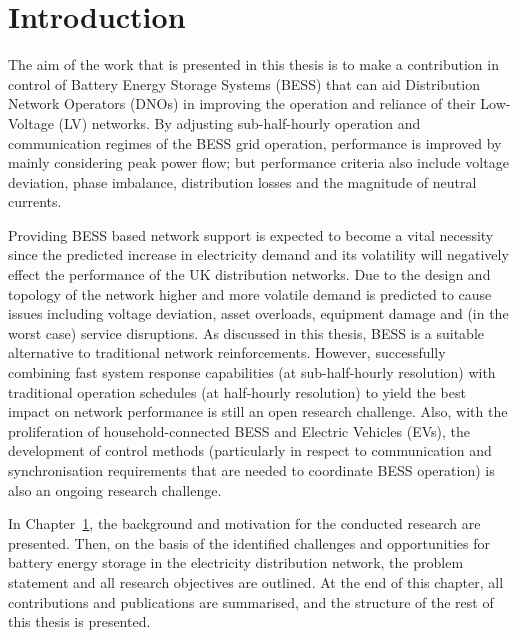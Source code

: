 \chapter{Introduction}
\label{ch-introduction}

The aim of the work that is presented in this thesis is to make a contribution in control of Battery Energy Storage Systems (BESS) that can aid Distribution Network Operators (DNOs) in improving the operation and reliance of their Low-Voltage (LV) networks.
By adjusting sub-half-hourly operation and communication regimes of the BESS grid operation, performance is improved by mainly considering peak power flow; but performance criteria also include voltage deviation, phase imbalance, distribution losses and the magnitude of neutral currents.

Providing BESS based network support is expected to become a vital necessity since the predicted increase in electricity demand and its volatility will negatively effect the performance of the UK distribution networks.
Due to the design and topology of the network higher and more volatile demand is predicted to cause issues including voltage deviation, asset overloads, equipment damage and (in the worst case) service disruptions.
As discussed in this thesis, BESS is a suitable alternative to traditional network reinforcements.
However, successfully combining fast system response capabilities (at sub-half-hourly resolution) with traditional operation schedules (at half-hourly resolution) to yield the best impact on network performance is still an open research challenge.
Also, with the proliferation of household-connected BESS and Electric Vehicles (EVs), the development of control methods (particularly in respect to communication and synchronisation requirements that are needed to coordinate BESS operation) is also an ongoing research challenge.

In Chapter~\ref{ch-introduction}, the background and motivation for the conducted research are presented.
Then, on the basis of the identified challenges and opportunities for battery energy storage in the electricity distribution network, the problem statement and all research objectives are outlined.
At the end of this chapter, all contributions and publications are summarised, and the structure of the rest of this thesis is presented.









